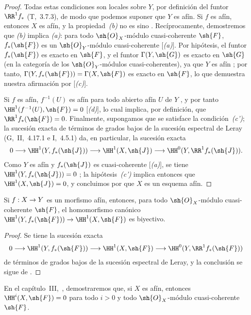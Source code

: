 \documentclass[oneside,10pt]{amsart}
\makeatletter
\newcommand{\ega@arrow}[2]{\mathchoice{#1}{#2}{#2}{#2}}
\renewcommand{\to}{\ega@arrow{\longrightarrow}{\rightarrow}}
\newcommand{\oldpage}[2][]{\marginnote{\normalfont\footnotesize\textbf{#1}~|~#2}\ignorespaces}
\let\EGAOriginalLabel\label
\renewcommand{\label}[1]{\phantomsection\EGAOriginalLabel{#1}}
\makeatother
\begin{document}
\begin{proof}
Todas estas condiciones son locales sobre $Y$, por definición del funtor $\RR^1f_*$ (T,~3.7.3), de modo que podemos suponer que $Y$ es afín.
Si $f$ es afín, entonces $X$ es afín, y la propiedad~\emph{(b)} no es sino .
Recíprocamente, demostremos que \emph{(b)} implica \emph{(a)}:
para todo $\sh{O}_X$-módulo cuasi-coherente $\sh{F}$, $f_*(\sh{F})$ es un $\sh{O}_Y$-módulo cuasi-coherente [\emph{(a)}].
Por hipótesis, el funtor $f_*(\sh{F})$ es exacto en $\sh{F}$, y el funtor $\Gamma(Y,\sh{G})$ es exacto en $\sh{G}$ (en la categoría de los $\sh{O}_Y$-módulos cuasi-coherentes), ya que $Y$ es afín ;
por tanto, $\Gamma(Y,f_*(\sh{F}))=\Gamma(X,\sh{F})$ es exacto en $\sh{F}$, lo que demuestra nuestra afirmación por [\emph{(c)}].

Si $f$ es afín, $f^{-1}(U)$ es afín para todo abierto afín $U$ de $Y$ , y por tanto $\HH^1(f^{-1}(U),\sh{F})=0$ [\emph{(d)}], lo cual implica, por definición, que $\RR^1f_*(\sh{F})=0$.
Finalmente, supongamos que se satisface la condición~\emph{(c')};
la sucesión exacta de términos de grados bajos de la sucesión espectral de Leray (G,~II,~4.17.1 e I,~4.5.1) da, en particular, la sucesión exacta
\[
  0\to\HH^1(Y,f_*(\sh{J}))\to\HH^1(X,\sh{J})\to\HH^0(Y,\RR^1f_*(\sh{J})).
\]
Como $Y$ es afín y $f_*(\sh{J})$ es cuasi-coherente [\emph{(a)}], se tiene $\HH^1(Y,f_*(\sh{J}))=0$ ;
la hipótesis~\emph{(c')} implica entonces que $\HH^1(X,\sh{J})=0$, y concluimos por  que $X$ es un esquema afín.
\end{proof}

\begin{corollary}[5.2.3]
\label{II.5.2.3}
Si $f:X\to Y$ es un morfismo afín, entonces, para todo $\sh{O}_X$-módulo cuasi-coherente $\sh{F}$, el homomorfismo canónico $\HH^1(Y,f_*(\sh{F}))\to\HH^1(X,\sh{F})$ es biyectivo.
\end{corollary}

\oldpage[II]{99}
\begin{proof}
Se tiene la sucesión exacta
\[
  0\to\HH^1(Y,f_*(\sh{F}))\to\HH^1(X,\sh{F})\to\HH^0(Y,\RR^1f_*(\sh{F}))
\]
de términos de grados bajos de la sucesión espectral de Leray, y la conclusión se sigue de .
\end{proof}

\begin{remark}[5.2.4]
\label{II.5.2.4}
En el capítulo~III,~, demostraremos que, si $X$ es afín, entonces $\HH^i(X,\sh{F})=0$ para todo $i>0$ y todo $\sh{O}_X$-módulo cuasi-coherente $\sh{F}$.
\end{remark}
\end{document}

